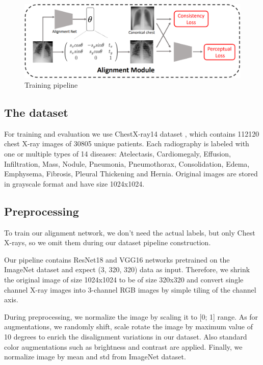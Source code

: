 \documentclass{article}
\begin{document}
\begin{figure}[ht]\label{overall_architecture}
    \vskip 0.2in
    \begin{center}
    \centerline{\includegraphics[width=\columnwidth * 2]{../images/overall_pipeline.png}}
    \caption{Training pipeline}
    \end{center}
    \vskip -0.2in
\end{figure}

\subsection{The dataset}
For training and evaluation we use ChestX-ray14 dataset \cite{DataSet}, which 
contains 112120 chest X-ray images of 30805 unique patients. Each radiography 
is labeled with one or multiple types of 14 diseases: Atelectasis, 
Cardiomegaly, Effusion, Infiltration, Mass, Nodule, Pneumonia, Pneumothorax, 
Consolidation, Edema, Emphysema, Fibrosis, Pleural Thickening and Hernia. 
Original images are stored in grayscale format and have size 1024x1024. 

\subsection{Preprocessing}
To train our alignment network, we don't need the actual labels, but only Chest 
X-rays, so we omit them during our dataset pipeline construction.

Our pipeline contains ResNet18 and VGG16 networks pretrained on the ImageNet 
dataset \cite{ImageNet} and expect (3, 320, 320) data as input. Therefore, we 
shrink the original image of size 1024x1024 to be of size 320x320 and convert 
single channel X-ray images into 3-channel RGB images by simple tiling of the 
channel axis.

During preprocessing, we normalize the image by scaling it to [0; 1] range. As 
for augmentations, we randomly shift, scale rotate the image by maximum value 
of 10 degrees to enrich the disalignment variations in our dataset. Also 
standard color augmentations such as brightness and contrast are applied. 
Finally, we normalize image by mean and std from ImageNet dataset.
\end{document}
